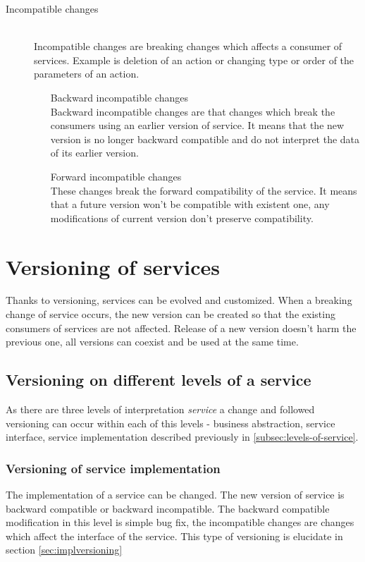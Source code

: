 \begin{description}
  \item[Incompatible changes] \hfill \\
  Incompatible changes are breaking changes which affects a consumer of services. Example is deletion of an action or changing type or order of the parameters of an action.
  \begin{enumerate} 
    \item[Backward incompatible changes]  \hfill \\
    Backward incompatible changes are that changes which break the consumers using an earlier version of service. It means that the new version is no longer backward compatible and do not interpret the data of its earlier version.
    \item[Forward incompatible changes] \hfill \\
    These changes break the forward compatibility of the service. It means that a future version won't be compatible with existent one, any modifications of current version don't preserve compatibility.
  \end{enumerate}
\end{description}

\section{Versioning of services}
\label{sec:verioningservices}
Thanks to versioning, services can be evolved and customized. When a breaking change of service occurs, the new version can be created so that the existing consumers of services are not affected. Release of a new version doesn't harm the previous one, all versions can coexist and be used at the same time. 

\subsection{Versioning on different levels of a service}
As there are three levels of interpretation \emph{service} a change and followed versioning can occur within each of this levels - business abstraction, service interface, service implementation described previously in \ref{subsec:levels-of-service}.

\subsubsection{\textbf{Versioning of service implementation}}
The implementation of a service can be changed. The new version of service is backward compatible or backward incompatible. The backward compatible modification in this level is simple bug fix, the incompatible changes are changes which affect the interface of the service. This type of versioning is elucidate in section \ref{sec:implversioning}

